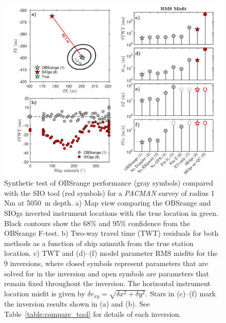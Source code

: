 \begin{figure}[h]
\includegraphics[trim=0cm 0cm 0cm 0cm,clip=true,width=\columnwidth]{Figure05.pdf}
\caption{ Synthetic test of OBSrange performance (gray symbols) compared with the SIO tool (red symbols) for a \textit{PACMAN} survey of radius 1 Nm at 5050~m depth. a) Map view comparing the OBSrange and SIOgs inverted instrument locations with the true location in green. Black contours show the 68\% and 95\% confidence from the OBSrange F-test. b) Two-way travel time (TWT) residuals for both methods as a function of ship azimuth from the true station location. c) TWT and (d)--(f) model parameter RMS misfits for the 9 inversions, where closed symbols represent parameters that are solved for in the inversion and open symbols are parameters that remain fixed throughout the inversion. The horizontal instrument location misfit is given by $\delta r_{xy} = \sqrt{\delta x^2 + \delta y^2} $. Stars in (c)--(f) mark the inversion results shown in (a) and (b). See Table~\ref{table:compare_tool} for details of each inversion.}
\label{fig:compare_tool}
\end{figure}

\newpage

